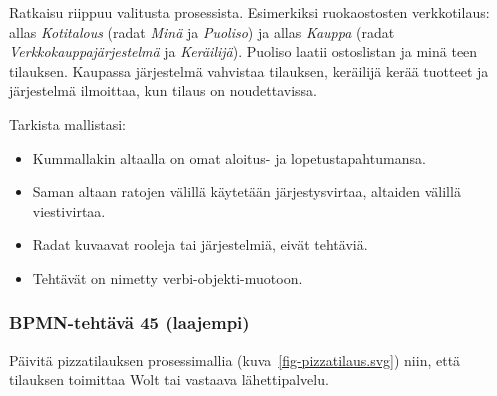 \documentclass[
  finnish,
  letterpaper,
  DIV=11,
  numbers=noendperiod,
  oneside]{scrreprt}
\providecommand{\tightlist}{%
  \setlength{\itemsep}{0pt}\setlength{\parskip}{0pt}}
\begin{document}
\begin{tcolorbox}[enhanced jigsaw, arc=.35mm, bottomrule=.15mm, bottomtitle=1mm, breakable, colback=white, colbacktitle=quarto-callout-tip-color!10!white, colframe=quarto-callout-tip-color-frame, coltitle=black, left=2mm, leftrule=.75mm, opacityback=0, opacitybacktitle=0.6, rightrule=.15mm, title=\textcolor{quarto-callout-tip-color}{\faLightbulb}\hspace{0.5em}{Malliratkaisu}, titlerule=0mm, toprule=.15mm, toptitle=1mm]

Ratkaisu riippuu valitusta prosessista. Esimerkiksi ruokaostosten
verkkotilaus: allas \emph{Kotitalous} (radat \emph{Minä} ja
\emph{Puoliso}) ja allas \emph{Kauppa} (radat
\emph{Verkkokauppajärjestelmä} ja \emph{Keräilijä}). Puoliso laatii
ostoslistan ja minä teen tilauksen. Kaupassa järjestelmä vahvistaa
tilauksen, keräilijä kerää tuotteet ja järjestelmä ilmoittaa, kun tilaus
on noudettavissa.

Tarkista mallistasi:

\begin{itemize}
\tightlist
\item
  Kummallakin altaalla on omat aloitus- ja lopetustapahtumansa.
\item
  Saman altaan ratojen välillä käytetään järjestysvirtaa, altaiden
  välillä viestivirtaa.
\item
  Radat kuvaavat rooleja tai järjestelmiä, eivät tehtäviä.
\item
  Tehtävät on nimetty verbi-objekti-muotoon.
\end{itemize}

\end{tcolorbox}

\subsubsection{BPMN-tehtävä 45
(laajempi)}\label{bpmn-tehtuxe4vuxe4-45-laajempi}

Päivitä pizzatilauksen prosessimallia (kuva~\ref{fig-pizzatilaus.svg})
niin, että tilauksen toimittaa Wolt tai vastaava lähettipalvelu.
\end{document}
